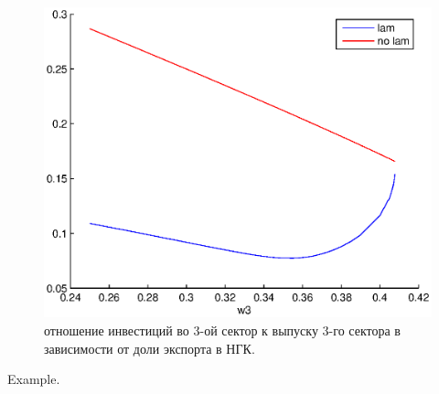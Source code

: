 \documentclass[12pt]{article}
\theoremstyle{rusdef}
\begin{document}
\begin{figure}[h!]
	\centering
	\includegraphics[scale=0.8]{pics/w3_unknown3.eps}
	\caption{отношение инвестиций во 3-ой сектор к выпуску 3-го сектора в зависимости от доли экспорта в НГК.}
\end{figure}\newpage
\begin{thebibliography}{99}
         Example.
\end{thebibliography}
\end{document}

